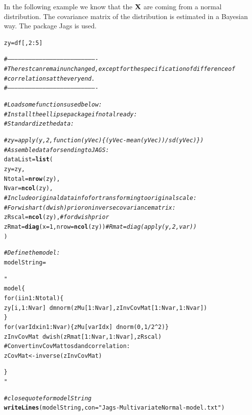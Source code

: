 \documentclass[11pt,a4paper,twoside]{book}\usepackage[]{graphicx}\usepackage[]{color}
\makeatletter
\newcommand{\hlnum}[1]{\textcolor[rgb]{0.686,0.059,0.569}{#1}}%
\newcommand{\hlstr}[1]{\textcolor[rgb]{0.192,0.494,0.8}{#1}}%
\newcommand{\hlcom}[1]{\textcolor[rgb]{0.678,0.584,0.686}{\textit{#1}}}%
\newcommand{\hlopt}[1]{\textcolor[rgb]{0,0,0}{#1}}%
\newcommand{\hlstd}[1]{\textcolor[rgb]{0.345,0.345,0.345}{#1}}%
\newcommand{\hlkwb}[1]{\textcolor[rgb]{0.69,0.353,0.396}{#1}}%
\newcommand{\hlkwc}[1]{\textcolor[rgb]{0.333,0.667,0.333}{#1}}%
\newcommand{\hlkwd}[1]{\textcolor[rgb]{0.737,0.353,0.396}{\textbf{#1}}}%
\newenvironment{kframe}{%
 \def\at@end@of@kframe{}%
 \ifinner\ifhmode%
  \def\at@end@of@kframe{\end{minipage}}%
  \begin{minipage}{\columnwidth}%
 \fi\fi%
 \def\FrameCommand##1{\hskip\@totalleftmargin \hskip-\fboxsep
 \colorbox{shadecolor}{##1}\hskip-\fboxsep
     \hskip-\linewidth \hskip-\@totalleftmargin \hskip\columnwidth}%
 \MakeFramed {\advance\hsize-\width
   \@totalleftmargin\z@ \linewidth\hsize
   \@setminipage}}%
 {\par\unskip\endMakeFramed%
 \at@end@of@kframe}
\newenvironment{knitrout}{}{} %
\makeatother
\begin{document}
In the following example we know that the ${\mathbf{X}}$ are coming from a normal distribution. The covariance matrix of the distribution is estimated in a Bayesian way. The package Jags is used.

\begin{knitrout}
\color{fgcolor}\begin{kframe}
\begin{alltt}
\hlstd{zy} \hlkwb{=} \hlstd{df[,}\hlnum{2}\hlopt{:}\hlnum{5}\hlstd{]}

\hlcom{#----------------------------------------------------------------------------}
\hlcom{# The rest can remain unchanged, except for the specification of difference of}
\hlcom{# correlations at the very end.}
\hlcom{#----------------------------------------------------------------------------}

\hlcom{# Load some functions used below:}
\hlcom{# Install the ellipse package if not already:}
\hlcom{# Standardize the data:}

\hlcom{#zy = apply(y,2,function(yVec)\{(yVec-mean(yVec))/sd(yVec)\})}
\hlcom{# Assemble data for sending to JAGS:}
\hlstd{dataList} \hlkwb{=} \hlkwd{list}\hlstd{(}
        \hlkwc{zy} \hlstd{= zy ,}
        \hlkwc{Ntotal} \hlstd{=}  \hlkwd{nrow}\hlstd{(zy) ,}
        \hlkwc{Nvar} \hlstd{=} \hlkwd{ncol}\hlstd{(zy) ,}
        \hlcom{# Include original data info for transforming to original scale:}
        \hlcom{# For wishart (dwish) prior on inverse covariance matrix:}
        \hlkwc{zRscal} \hlstd{=} \hlkwd{ncol}\hlstd{(zy) ,}  \hlcom{# for dwish prior}
        \hlkwc{zRmat} \hlstd{=} \hlkwd{diag}\hlstd{(}\hlkwc{x}\hlstd{=}\hlnum{1}\hlstd{,}\hlkwc{nrow}\hlstd{=}\hlkwd{ncol}\hlstd{(zy))}  \hlcom{# Rmat = diag(apply(y,2,var))}
\hlstd{)}

\hlcom{# Define the model:}
\hlstd{modelString} \hlkwb{=} \hlstr{"
model \{
for ( i in 1:Ntotal ) \{
zy[i,1:Nvar] ~ dmnorm( zMu[1:Nvar] , zInvCovMat[1:Nvar,1:Nvar] ) 
\}
for ( varIdx in 1:Nvar ) \{ zMu[varIdx] ~ dnorm( 0 , 1/2^2 ) \}
zInvCovMat ~ dwish( zRmat[1:Nvar,1:Nvar] , zRscal )
# Convert invCovMat to sd and correlation:
zCovMat <- inverse( zInvCovMat )

\}
"} \hlcom{# close quote for modelString}
\hlkwd{writeLines}\hlstd{( modelString ,} \hlkwc{con}\hlstd{=}\hlstr{"Jags-MultivariateNormal-model.txt"} \hlstd{)}


\end{alltt}
\end{kframe}
\end{knitrout}
\end{document}
